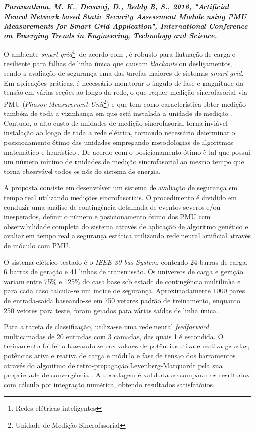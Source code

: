\documentclass[12pt,oneside,a4paper,chapter=TITLE,section=TITLE,sumario=tradicional,english,brazil]{abntex2}
\begin{document}
\textbf{\textit{Paramathma, M. K., Devaraj, D., Reddy B, S., 2016, "Artificial Neural Network based Static Security Assessment Module using PMU Measurements for Smart Grid Application",  International Conference on Emerging Trends in Engineering, Technology and Science.}}\par 
	O ambiente \textit{smart grid}\footnote{Redes elétricas inteligentes}, de acordo com \cite{wang2011}, é robusto para flutuação de carga e resiliente para falhas de linha única que causam \textit{blackouts} ou desligamentos, sendo a avaliação de segurança uma das tarefas maiores de sistemas \textit{smart grid}. Em aplicações práticas, é necessário monitorar o ângulo de fase e magnitude da tensão em várias seções ao longo da rede, o que requer medição sincrofasorial via PMU (\textit{Phasor Measurement Unit}\footnote{Unidade de Medição Sincrofasorial}) e que tem como característica obter medição também de toda a vizinhança em que está instalada a unidade de medição \cite{ghosa2013}. Contudo, o alto custo de unidades de medição sincrofasorial torna inviável instalação ao longo de toda a rede elétrica, tornando necessário determinar o posicionamento ótimo das unidades empregando metodologias de algoritmos matemático e heurístico  \cite{aminifar2010}. De acordo com \textcite{paramathma2019} o posicionamento ótimo é tal que possui um número mínimo de unidades de medição sincrofasorial ao mesmo tempo que torna observável todos os nós do sistema de energia.\par
	A proposta consiste em desenvolver um sistema de avaliação de segurança em tempo real utilizando medições sincrofasoriais. O procedimento é dividido em conduzir uma análise de contingência detalhada de eventos severos e/ou inesperados, definir o número e posicionamento ótimo dos PMU com observabilidade completa do sistema através de aplicação de algoritmo genético e avaliar em tempo real a segurança estática utilizando rede neural artificial através de módulo com PMU. \par
	O sistema elétrico testado é o \textit{IEEE 30-bus System}, contendo 24 barras de carga, 6 barras de geração e 41 linhas de transmissão. Os universos de carga e geração variam entre 75\% e 125\% do caso base sob estado de contingência multilinha e para cada caso calcula-se um índice de segurança. Aproximadamente 1000 pares de entrada-saída baseando-se em 750 vetores padrão de treinamento, enquanto 250 vetores para teste, foram gerados para várias saídas de linha única.\par 
	Para a tarefa de classificação, utiliza-se uma rede neural \textit{feedforward} multicamadas de 20 entradas com 3 camadas, das quais 1 é escondida. O treinamento foi feito baseando se nos valores de potências ativa e reativa geradas, potências ativa e reativa de carga e módulo e fase de tensão dos barramentos através do algoritmo de retro-propagação Levenberg-Marquardt pela sua propriedade de convergência \cite{devaraj2007}. A abordagem é validada ao comparar os resultados com cálculo por integração numérica, obtendo resultados satisfatórios. \par 
\end{document}
